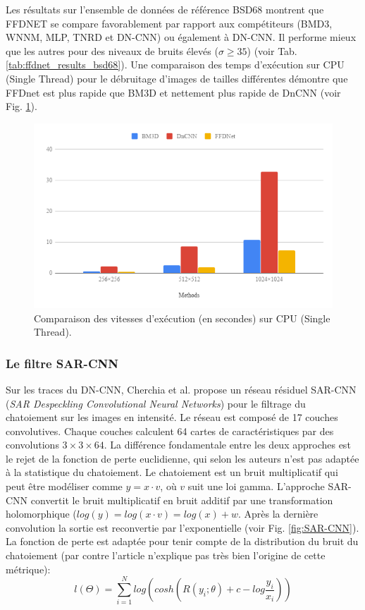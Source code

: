 Les résultats sur l'ensemble de données de référence BSD68 montrent que FFDNET se compare favorablement par rapport aux compétiteurs (BMD3, WNNM, MLP, TNRD et DN-CNN) ou également à DN-CNN.  Il performe mieux que les autres pour des niveaux de bruits élevés ($\sigma \geq 35$) (voir Tab. \ref{tab:ffdnet_results_bsd68}). Une comparaison des temps d'exécution sur CPU (Single Thread) pour le débruitage d'images de tailles différentes démontre que FFDnet est plus rapide que BM3D et nettement plus rapide de DnCNN (voir Fig. \ref{fig:vitesses_ffdnet}).



\begin{figure}
  \includegraphics[width=0.75\linewidth]{figures/geo6393/vitesses_ffdnet.png}
   \centering
  \caption{Comparaison des vitesses d'exécution (en secondes) sur CPU (Single Thread).}
  \label{fig:vitesses_ffdnet}
\end{figure}

\subsubsection{Le filtre SAR-CNN}

Sur les traces du DN-CNN, Cherchia et al. \cite{Chierchia2017SARCNN} propose un réseau résiduel SAR-CNN (\textit{SAR Despeckling Convolutional Neural Networks}) pour le filtrage du chatoiement sur les images \acr en intensité. Le réseau est composé de 17 couches convolutives.  Chaque couches calculent 64 cartes de caractéristiques par des convolutions $3 \times 3 \times 64$. La différence fondamentale entre les deux approches est le rejet de la fonction de perte euclidienne, qui selon les auteurs n'est pas adaptée à la statistique du chatoiement.  Le chatoiement est un bruit multiplicatif qui peut être modéliser comme $y=x \cdot v$, où $v$ suit une loi gamma.  L'approche SAR-CNN convertit le bruit multiplicatif en bruit additif par une transformation holomorphique ($ log(y) = log(x \cdot v) = log(x) + w$.  Après la dernière convolution la sortie est reconvertie par l'exponentielle (voir Fig. \ref{fig:SAR-CNN}).  La fonction de perte est adaptée pour tenir compte de la distribution du bruit du chatoiement (par contre l'article n'explique pas très bien l'origine de cette métrique):
\begin{equation}
    l(\Theta)=\sum_{i=1}^{N}{log(cosh(R(y_i;\theta) + c -log \frac{y_i}{x_i}))}
\end{equation}

